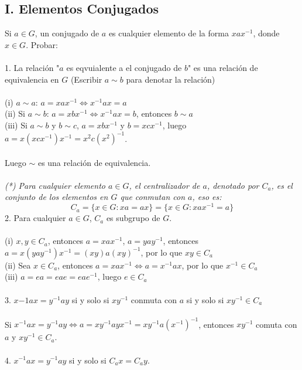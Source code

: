 \documentclass{article}
\begin{document}
\subsection*{I. Elementos Conjugados}
Si $a \in G$, un conjugado de $a$ es cualquier elemento de la forma $xax^{-1}$, donde $x \in G$. Probar:
\\
\\
1. La relación "$a$ es eqvuialente a el conjugado de $b$" es una relación de equivalencia en $G$ (Escribir $a \sim b$ para denotar la relación)
\\
\\
(i) $a \sim a$: $a=xax^{-1} \Longleftrightarrow x^{-1}ax=a$
\\
(ii) Si $a \sim b$: $a=xbx^{-1} \Longleftrightarrow x^{-1}ax=b$, entonces $b \sim a$
\\
(iii) Si $a \sim b$ y $b \sim c$, $a=xbx^{-1}$ y $b=xcx^{-1}$, luego $a=x(xcx^{-1})x^{-1}=x^{2}c(x^{2})^{-1}$.
\\
\\
Luego $\sim$ es una relación de equivalencia.
\\
\\
\textit{(*) Para cualquier elemento $a \in G$, el centralizador de $a$, denotado por $C_{a}$, es el conjunto de los elementos en $G$ que conmutan con $a$, eso es:}
\begin{equation*}
    C_{a}=\{x \in G: xa=ax \} = \{x \in G: xax^{-1}=a \}
\end{equation*}
2. Para cualquier $a \in G$, $C_{a}$ es subgrupo de $G$.
\\
\\
(i) $x,y \in C_{a}$, entonces $a=xax^{-1}$, $a=yay^{-1}$, entonces $a=x(yay^{-1})x^{-1}=(xy)a(xy)^{-1}$, por lo que $xy \in C_{a}$
\\
(ii) Sea $x \in C_{a}$, entonces $a=xax^{-1} \Longleftrightarrow a=x^{-1}ax$, por lo que $x^{-1} \in C_a$
\\
(iii) $a=ea=eae=eae^{-1}$, luego $e \in C_a$
\\
\\
3. $x{-1}ax=y^{-1}ay$ si y solo si $xy^{-1}$ conmuta con $a$ si y solo si $xy^{-1} \in C_a$
\\
\\
Si $x^{-1}ax=y^{-1}ay \Longleftrightarrow a=xy^{-1}ayx^{-1}=xy^{-1}a(x^{-1})^{-1}$, entonces $xy^{-1}$ comuta con $a$ y $xy^{-1} \in C_a$.
\\
\\
4. $x^{-1}ax=y^{-1}ay$ si y solo si $C_ax=C_ay$.
\\
\end{document}
